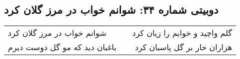 \begin{center}
\section*{دوبیتی شماره ۳۴: شوانم خواب در مرز گلان کرد}
\label{sec:034}
\begin{longtable}{l p{0.5cm} r}
شوانم خواب در مرز گلان کرد
&&
گلم واچید و خوابم را زیان کرد
\\
باغبان دید که مو گل دوست دیرم
&&
هزاران خار بر گل پاسبان کرد
\\
\end{longtable}
\end{center}

